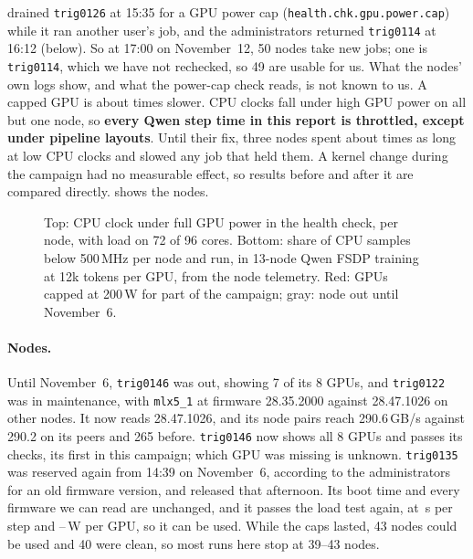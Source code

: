drained \texttt{trig0126} at 15:35 for a GPU power cap (\texttt{health.chk.gpu.power.cap}) while it ran another user's job, and the administrators returned \texttt{trig0114} at 16:12 (below). So at 17:00 on November~12, 50 nodes take new jobs; one is \texttt{trig0114}, which we have not rechecked, so 49 are usable for us. What the nodes' own logs show, and what the power-cap check reads, is not known to us. A capped GPU is about
\TriCapFactor{} times slower. CPU clocks fall under high GPU power on all but one node, so \textbf{every Qwen step
time in this report is throttled, except under pipeline layouts}. Until their fix, three nodes spent about \TriProbeSlowRatio{} times as long at low CPU clocks and slowed any job that held them. A kernel change during the
campaign had no measurable effect, so results before and after it are compared directly.  shows the nodes.

\begin{figure}[h]
  \centering{}
  \caption{Top: CPU clock under full GPU power in the health check, per node, with load on 72 of 96 cores. Bottom: share of CPU samples below 500\,MHz per
    node and run, in 13-node Qwen FSDP training at 12k tokens per GPU, from the node telemetry. Red: GPUs capped at 200\,W for part of the campaign; gray: node out until November~6.}
  \label{fig:machine_status}
\end{figure}

\paragraph{Nodes.} Until November~6, \texttt{trig0146} was out, showing 7 of its 8 GPUs, and \texttt{trig0122} was in maintenance, with \texttt{mlx5\_1} at firmware 28.35.2000 against 28.47.1026 on other nodes. It now reads 28.47.1026, and its node pairs reach 290.6\,GB/s against 290.2 on its peers and 265 before. \texttt{trig0146} now shows all 8 GPUs and passes its checks, its first in this campaign; which GPU was missing is unknown. \texttt{trig0135} was reserved again from 14:39 on November~6, according to the administrators for an old firmware version, and released that afternoon. Its boot time and every firmware we can read are unchanged, and it passes the load test again, at \TriReturnStep\,s per step and \TriReturnWattLo--\TriReturnWattHi\,W per GPU, so it can be used. While the caps lasted, 43 nodes could be used and 40 were clean, so most runs here stop at 39--43 nodes.

